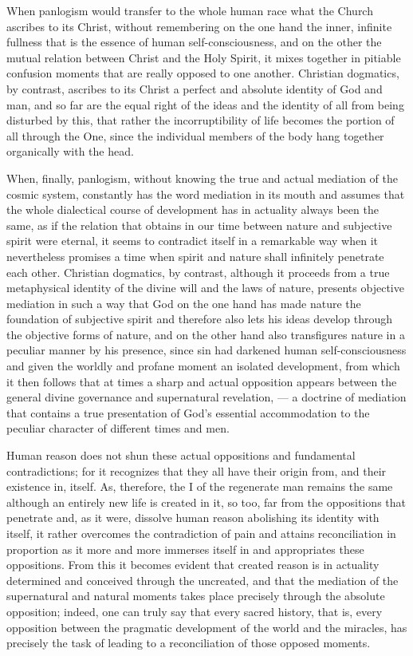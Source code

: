 \documentclass[12pt]{book}
\newcommand{\opage}[1]{\marginnote{\footnotesize\textit{[#1]}}}
\begin{document}
When panlogism would transfer to the whole human race what the Church ascribes
to its Christ, without remembering on the one hand the inner, infinite fullness
that is the essence of human self-consciousness, and on the other the mutual
relation between Christ and the Holy Spirit, it mixes together in pitiable
confusion moments that are really opposed to one another. Christian dogmatics,
by contrast, ascribes to its Christ a perfect and absolute identity of God and
man, and so far are the equal right of the ideas and the identity of all from
being disturbed by this, that rather the incorruptibility of life becomes the
portion of all through the One, since the individual members of the body hang
together organically with the head.

When, finally, panlogism, without knowing the true and actual mediation of the
cosmic system, constantly has the word mediation in its mouth and assumes that
the whole dialectical course of development has in actuality always been the
same, as if the relation that obtains in our time between nature and subjective
spirit were eternal, it seems to contradict itself in a remarkable way when it
nevertheless promises a time when spirit and nature shall infinitely penetrate
each other. Christian dogmatics, by contrast, although it proceeds from a true
metaphysical identity
\opage{149} of the divine will and the laws of nature, presents objective
mediation in such a way that God on the one hand has made nature the foundation
of subjective spirit and therefore also lets his ideas develop through the
objective forms of nature, and on the other hand also transfigures nature in a
peculiar manner by his presence, since sin had darkened human self-consciousness
and given the worldly and profane moment an isolated development, from which it
then follows that at times a sharp and actual opposition appears between the
general divine governance and supernatural revelation, --- a doctrine of
mediation that contains a true presentation of God's essential accommodation to
the peculiar character of different times and men.

Human reason does not shun these actual oppositions and fundamental
contradictions; for it recognizes that they all have their origin from, and
their existence in, itself. As, therefore, the I of the regenerate man remains
the same although an entirely new life is created in it, so too, far from the
oppositions that penetrate and, as it were, dissolve human reason abolishing its
identity with itself, it rather overcomes the contradiction of pain and attains
reconciliation in proportion as it more and more immerses itself in and
appropriates these oppositions. From this it becomes evident that created reason
is in actuality determined and conceived through the uncreated, and that the
mediation of the supernatural and natural moments takes place precisely through
the absolute opposition; indeed, one can truly say that every sacred history,
that is, every opposition between the pragmatic development of the world and the
miracles, has precisely the task of leading to a reconciliation of those opposed
moments.
\end{document}
